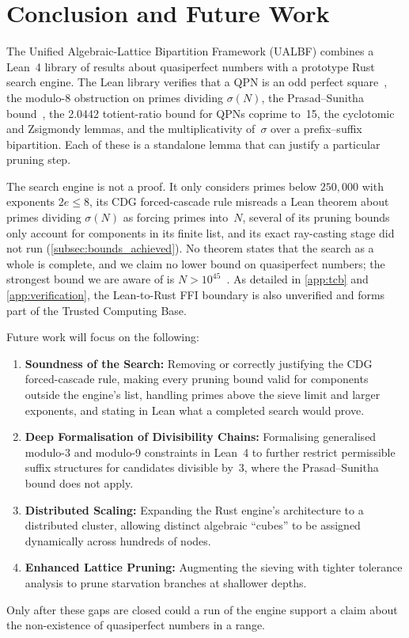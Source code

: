 \section{Conclusion and Future Work}
\label{sec:conclusion}

The Unified Algebraic-Lattice Bipartition Framework (UALBF) combines a
Lean~4 library of results about quasiperfect numbers with a prototype
Rust search engine.  The Lean library verifies that a QPN is an odd
perfect square~\cite{cattaneo1951}, the modulo-8 obstruction on primes
dividing $\sigma(N)$, the Prasad--Sunitha bound~\cite{prasad_sunitha},
the 2.0442 totient-ratio bound for QPNs coprime to~15, the cyclotomic
and Zsigmondy lemmas, and the multiplicativity of~$\sigma$ over a
prefix--suffix bipartition.  Each of these is a standalone lemma that
can justify a particular pruning step.

The search engine is not a proof.  It only considers primes below
$250{,}000$ with exponents $2e \le 8$, its CDG forced-cascade rule
misreads a Lean theorem about primes dividing $\sigma(N)$ as forcing
primes into~$N$, several of its pruning bounds only account for
components in its finite list, and its exact ray-casting stage did not
run (\cref{subsec:bounds_achieved}).  No theorem states that the search
as a whole is complete, and we claim no lower bound on quasiperfect
numbers; the strongest bound we are aware of is
$N > 10^{45}$~\cite{alekseyev2026}.
As detailed in \cref{app:tcb} and \cref{app:verification}, the
Lean-to-Rust FFI boundary is also unverified and forms part of the
Trusted Computing Base.

Future work will focus on the following:

\begin{enumerate}
  \item \textbf{Soundness of the Search:}
    Removing or correctly justifying the CDG forced-cascade rule,
    making every pruning bound valid for components outside the
    engine's list, handling primes above the sieve limit and larger
    exponents, and stating in Lean what a completed search would
    prove.

  \item \textbf{Deep Formalisation of Divisibility Chains:}
    Formalising generalised modulo-3 and modulo-9 constraints in
    Lean~4 to further restrict permissible suffix structures for
    candidates divisible by~3, where the Prasad--Sunitha bound does
    not apply.

  \item \textbf{Distributed Scaling:}
    Expanding the Rust engine's architecture to a distributed cluster,
    allowing distinct algebraic ``cubes'' to be assigned dynamically
    across hundreds of nodes.

  \item \textbf{Enhanced Lattice Pruning:}
    Augmenting the sieving with tighter tolerance analysis to prune starvation branches at
    shallower depths.
\end{enumerate}

Only after these gaps are closed could a run of the engine support a
claim about the non-existence of quasiperfect numbers in a range.
